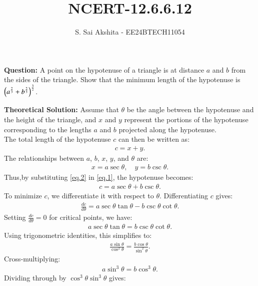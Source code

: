 \documentclass[journal,12pt,onecolumn]{IEEEtran}
\theoremstyle{remark}
\begin{document}

\vspace{3cm}

\title{NCERT-12.6.6.12}
\author{S. Sai Akshita - EE24BTECH11054}
\newpage
\maketitle
\bigskip

\renewcommand{\thefigure}{\theenumi}
\renewcommand{\thetable}{\theenumi}
\textbf{Question:} A point on the hypotenuse of a triangle is at distance $a$ and $b$ from the sides of the triangle. Show that the minimum length of the hypotenuse is $\left(a^{\frac{2}{3}}+b^{\frac{2}{3}}\right)^{\frac{3}{2}}$.

\textbf{Theoretical Solution:}
Assume that $\theta$ be the angle between the hypotenuse and the height of the triangle, and $x$ and $y$ represent the portions of the hypotenuse corresponding to the lengths $a$ and $b$ projected along the hypotenuse.\\
The total length of the hypotenuse $c$ can then be written as:
\begin{align}
    c = x + y.\label{eq.1}
\end{align}
The relationships between $a$, $b$, $x$, $y$, and $\theta$ are:
\begin{align}
    x = a \sec\theta, \quad y = b \csc\theta.\label{eq.2}
\end{align}
Thus,by substituting \ref{eq.2} in \ref{eq.1}, the hypotenuse becomes:
\begin{align}
c = a \sec\theta + b \csc\theta.\label{eq.3}
\end{align}
To minimize $c$, we differentiate it with respect to $\theta$. Differentiating $c$ gives:
\begin{align}
\frac{dc}{d\theta} = a \sec\theta \tan\theta - b \csc\theta \cot\theta.\label{eq.4}
\end{align}
Setting $\frac{dc}{d\theta} = 0$ for critical points, we have:
\begin{align}
a \sec\theta \tan\theta = b \csc\theta \cot\theta.
\end{align}
Using trigonometric identities, this simplifies to:
\begin{align}
\frac{a \sin\theta}{\cos^2\theta} = \frac{b \cos\theta}{\sin^2\theta}.
\end{align}
Cross-multiplying:
\begin{align}
a \sin^3\theta = b \cos^3\theta.
\end{align}
Dividing through by $\cos^3\theta \sin^3\theta$ gives:
\end{document}
